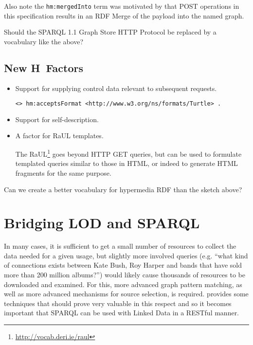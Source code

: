 \documentclass{llncs}
\begin{document}
Also note the \texttt{hm:mergedInto} term was motivated by that POST
operations in this specification results in an RDF Merge of the
payload into the named graph. 

\begin{question}
Should the SPARQL 1.1 Graph Store HTTP Protocol be replaced by a
vocabulary like the above?
\end{question}

\subsection{New H~Factors}

\begin{itemize}
\item Support for supplying control data relevant to subsequent requests.


\begin{verbatim}
<> hm:acceptsFormat <http://www.w3.org/ns/formats/Turtle> .
\end{verbatim}

\item Support for self-description.

\item A factor for RaUL templates. 

The RaUL\footnote{\url{http://vocab.deri.ie/raul}} goes beyond HTTP
GET queries, but can be used to formulate templated queries similar to
those in HTML, or indeed to generate HTML fragments for the same purpose.


\end{itemize}


\begin{question}
Can we create a better vocabulary for hypermedia RDF than the sketch above?
\end{question}


\section{Bridging LOD and SPARQL}

In many cases, it is sufficient to get a small number of resources to
collect the data needed for a given usage, but slightly more involved
queries (e.g. ``what kind of connections exists between Kate Bush, Roy
Harper and bands that have sold more than 200 million albums?'') would
likely cause thousands of resources to be downloaded and examined. For
this, more advanced graph pattern matching, as well as more advanced
mechanisms for source selection, is
required. \cite{springerlink:10.1007/978-3-642-25073-6-38} provides
some techniques that should prove very valuable in this respect and so
it becomes important that SPARQL can be used with Linked Data in a
RESTful manner.
\end{document}
